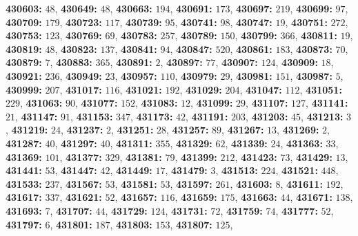 \textsf{\bfseries 430603:} $48$, \textsf{\bfseries 430649:} $48$, \textsf{\bfseries 430663:} $194$, \textsf{\bfseries 430691:} $173$, \textsf{\bfseries 430697:} $219$, \textsf{\bfseries 430699:} $97$, \textsf{\bfseries 430709:} $179$, \textsf{\bfseries 430723:} $117$, \textsf{\bfseries 430739:} $95$, \textsf{\bfseries 430741:} $98$, \textsf{\bfseries 430747:} $19$, \textsf{\bfseries 430751:} $272$, \textsf{\bfseries 430753:} $123$, \textsf{\bfseries 430769:} $69$, \textsf{\bfseries 430783:} $257$, \textsf{\bfseries 430789:} $150$, \textsf{\bfseries 430799:} $366$, \textsf{\bfseries 430811:} $19$, \textsf{\bfseries 430819:} $48$, \textsf{\bfseries 430823:} $137$, \textsf{\bfseries 430841:} $94$, \textsf{\bfseries 430847:} $520$, \textsf{\bfseries 430861:} $183$, \textsf{\bfseries 430873:} $70$, \textsf{\bfseries 430879:} $7$, \textsf{\bfseries 430883:} $365$, \textsf{\bfseries 430891:} $2$, \textsf{\bfseries 430897:} $77$, \textsf{\bfseries 430907:} $124$, \textsf{\bfseries 430909:} $18$, \textsf{\bfseries 430921:} $236$, \textsf{\bfseries 430949:} $23$, \textsf{\bfseries 430957:} $110$, \textsf{\bfseries 430979:} $29$, \textsf{\bfseries 430981:} $151$, \textsf{\bfseries 430987:} $5$, \textsf{\bfseries 430999:} $207$, \textsf{\bfseries 431017:} $116$, \textsf{\bfseries 431021:} $192$, \textsf{\bfseries 431029:} $204$, \textsf{\bfseries 431047:} $112$, \textsf{\bfseries 431051:} $229$, \textsf{\bfseries 431063:} $90$, \textsf{\bfseries 431077:} $152$, \textsf{\bfseries 431083:} $12$, \textsf{\bfseries 431099:} $29$, \textsf{\bfseries 431107:} $127$, \textsf{\bfseries 431141:} $21$, \textsf{\bfseries 431147:} $91$, \textsf{\bfseries 431153:} $347$, \textsf{\bfseries 431173:} $42$, \textsf{\bfseries 431191:} $203$, \textsf{\bfseries 431203:} $45$, \textsf{\bfseries 431213:} $3$, \textsf{\bfseries 431219:} $24$, \textsf{\bfseries 431237:} $2$, \textsf{\bfseries 431251:} $28$, \textsf{\bfseries 431257:} $89$, \textsf{\bfseries 431267:} $13$, \textsf{\bfseries 431269:} $2$, \textsf{\bfseries 431287:} $40$, \textsf{\bfseries 431297:} $40$, \textsf{\bfseries 431311:} $355$, \textsf{\bfseries 431329:} $62$, \textsf{\bfseries 431339:} $24$, \textsf{\bfseries 431363:} $33$, \textsf{\bfseries 431369:} $101$, \textsf{\bfseries 431377:} $329$, \textsf{\bfseries 431381:} $79$, \textsf{\bfseries 431399:} $212$, \textsf{\bfseries 431423:} $73$, \textsf{\bfseries 431429:} $13$, \textsf{\bfseries 431441:} $53$, \textsf{\bfseries 431447:} $42$, \textsf{\bfseries 431449:} $17$, \textsf{\bfseries 431479:} $3$, \textsf{\bfseries 431513:} $224$, \textsf{\bfseries 431521:} $448$, \textsf{\bfseries 431533:} $237$, \textsf{\bfseries 431567:} $53$, \textsf{\bfseries 431581:} $53$, \textsf{\bfseries 431597:} $261$, \textsf{\bfseries 431603:} $8$, \textsf{\bfseries 431611:} $192$, \textsf{\bfseries 431617:} $337$, \textsf{\bfseries 431621:} $52$, \textsf{\bfseries 431657:} $116$, \textsf{\bfseries 431659:} $175$, \textsf{\bfseries 431663:} $44$, \textsf{\bfseries 431671:} $138$, \textsf{\bfseries 431693:} $7$, \textsf{\bfseries 431707:} $44$, \textsf{\bfseries 431729:} $124$, \textsf{\bfseries 431731:} $72$, \textsf{\bfseries 431759:} $74$, \textsf{\bfseries 431777:} $52$, \textsf{\bfseries 431797:} $6$, \textsf{\bfseries 431801:} $187$, \textsf{\bfseries 431803:} $153$, \textsf{\bfseries 431807:} $125$, 
